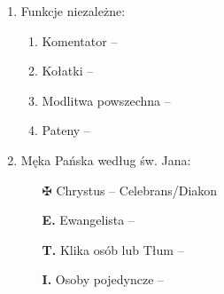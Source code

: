 \documentclass[10pt,oneside,final,notitlepage,a4paper,wide]{mwart}
\begin{document}
\begin{enumerate}
\smallskip
	\item Funkcje niezależne:
	\begin{enumerate}
		\item Komentator --
		\item Kołatki -- 
		\item Modlitwa powszechna -- 
		\item Pateny --
	\end{enumerate}
\medskip
	\item Męka Pańska według św. Jana:
	\begin{itemize}
		\item[$\maltese$] Chrystus -- Celebrans/Diakon
		\item[\textbf{E.}] Ewangelista -- 
		\item[\textbf{T.}] Klika osób lub Tłum -- 
		\item[\textbf{I.}] Osoby pojedyncze -- 
	\end{itemize}
\end{enumerate}
\end{document}

